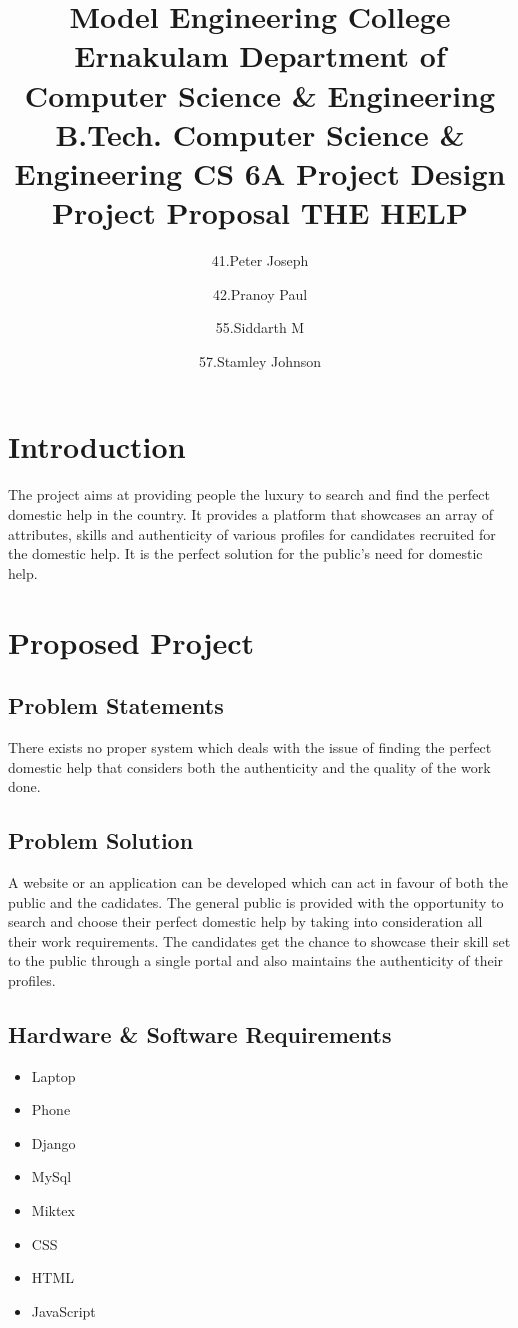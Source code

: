 \documentclass[a4paper]{article}
\title{Model Engineering College Ernakulam \linebreak 
Department of Computer Science \& Engineering \linebreak
B.Tech. Computer Science \& Engineering \linebreak
CS 6A Project Design \linebreak
Project Proposal \linebreak
THE HELP}
\author{41.Peter Joseph \and 42.Pranoy Paul \and 55.Siddarth M \and 57.Stamley Johnson}
\begin{document}
\maketitle



\section{Introduction}

The project aims at providing people the luxury to search and find the perfect domestic help in the country.
It provides a platform that showcases an array of attributes, skills and authenticity of various profiles for candidates recruited for the domestic help.
It is the perfect solution for the public's need for domestic help. 

\section{Proposed Project}



\subsection{Problem Statements}

There exists no proper system which deals with the issue of finding the perfect domestic help that considers both the authenticity and the quality of the work done.

\subsection{Problem Solution}

A website or an application can be developed which can act in favour of both the public and the cadidates. 
The general public is provided with the opportunity to search and choose their perfect domestic help by taking into consideration all their work requirements. 
The candidates get the chance to showcase their skill set to the public through a single portal and also maintains the authenticity of their profiles. 


\subsection{Hardware \& Software Requirements}

\begin{itemize}
\item Laptop
\item Phone
\item Django
\item MySql
\item Miktex
\item CSS
\item HTML
\item JavaScript
\end{itemize}
\end{document}

